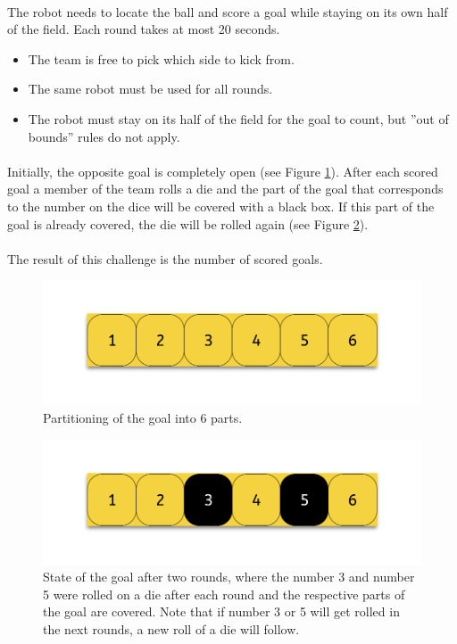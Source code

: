 \documentclass{article}
\newcommand*{\p}{\paragraph{}}
\begin{document}
\p The robot needs to locate the ball and score a goal while
staying on its own half of the field. Each round takes at most 20 seconds.

\begin{itemize}
    \item The team is free to pick which side to kick from.
    \item The same robot must  be used for all rounds.
    \item The robot must stay on its half of the field for the
            goal to count, but ''out of bounds'' rules do not apply.
\end{itemize}

\p Initially, the opposite goal is completely open (see Figure
\ref{fig:goal_parts}). After each
scored goal a member of the team rolls a die and the part of the goal that
corresponds to the number on the dice will be covered with a black box. If
this part of the goal is already covered, the die will be rolled again (see
Figure \ref{fig:goal_parts_filled}).

\p The result of this challenge is the number of scored goals.

\begin{figure}
  \centering
  \includegraphics[width=.9\linewidth]{media/goal_parts}
  \caption{Partitioning of the goal into 6 parts.}
  \label{fig:goal_parts}
\end{figure}%
\begin{figure}
  \centering
  \includegraphics[width=.9\linewidth]{media/goal_parts_filled}
  \caption{State of the goal after two rounds, where the number 3 and number 5
      were rolled on a die after each round and the respective parts of the
      goal are covered. Note that if number 3 or 5 will get rolled in the next
      rounds, a new roll of a die will follow.}
  \label{fig:goal_parts_filled}
\end{figure}
\end{document}
